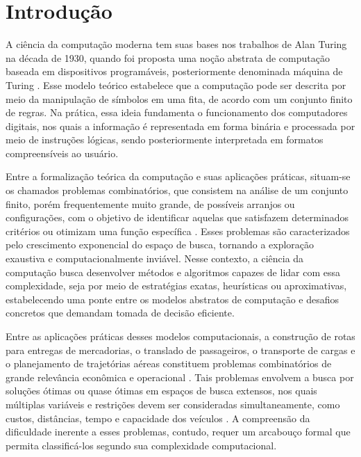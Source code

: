 
\chapter*[Introdução]{Introdução}

A ciência da computação moderna tem suas bases nos trabalhos de Alan Turing na década de 1930, quando foi proposta uma noção abstrata de computação baseada em dispositivos programáveis, posteriormente denominada máquina de Turing \cite{farias2013introduccao}. Esse modelo teórico estabelece que a computação pode ser descrita por meio da manipulação de símbolos em uma fita, de acordo com um conjunto finito de regras. Na prática, essa ideia fundamenta o funcionamento dos computadores digitais, nos quais a informação é representada em forma binária e processada por meio de instruções lógicas, sendo posteriormente interpretada em formatos compreensíveis ao usuário. 

Entre a formalização teórica da computação e suas aplicações práticas, situam-se os chamados problemas combinatórios, que consistem na análise de um conjunto finito,  porém frequentemente muito grande, de possíveis arranjos ou configurações, com o objetivo de identificar aquelas que satisfazem determinados critérios ou otimizam uma função específica \cite{papadimitriou1998combinatorial}. Esses problemas são caracterizados pelo crescimento exponencial do espaço de busca, tornando a exploração exaustiva e computacionalmente inviável. Nesse contexto, a ciência da computação busca desenvolver métodos e algoritmos capazes de lidar com essa complexidade, seja por meio de estratégias exatas, heurísticas ou aproximativas, estabelecendo uma ponte entre os modelos abstratos de computação e desafios concretos que demandam tomada de decisão eficiente.

Entre as aplicações práticas desses modelos computacionais, a construção de rotas para entregas de mercadorias, o translado de passageiros, o transporte de cargas e o planejamento de trajetórias aéreas constituem problemas combinatórios de grande relevância econômica e operacional \cite{toth2002vehicle}. Tais problemas envolvem a busca por soluções ótimas ou quase ótimas em espaços de busca extensos, nos quais múltiplas variáveis e restrições devem ser consideradas simultaneamente, como custos, distâncias, tempo e capacidade dos veículos \cite{braekers2016vehicle}. A compreensão da dificuldade inerente a esses problemas, contudo, requer um arcabouço formal que permita classificá-los segundo sua complexidade computacional.

